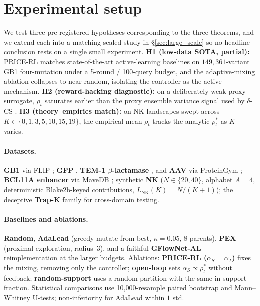 \section{Experimental setup}
\label{sec:experiments}

We test three pre-registered hypotheses corresponding to the three theorems, and we extend each into a matching scaled study in §\ref{sec:large_scale} so no headline conclusion rests on a single small experiment. \textbf{H1 (low-data SOTA, partial):} PRICE-RL matches state-of-the-art active-learning baselines on $149{,}361$-variant GB1 four-mutation \citep{wu2016adaptation} under a 5-round / 100-query budget, and the adaptive-mixing ablation collapses to near-random, isolating the controller as the active mechanism. \textbf{H2 (reward-hacking diagnostic):} on a deliberately weak proxy surrogate, $\rho_t$ saturates earlier than the proxy ensemble variance signal used by $\delta$-CS \citep{kim2025deltacs}. \textbf{H3 (theory--empirics match):} on NK landscapes \citep{kauffman1989nk} swept across $K\in\{0,1,3,5,10,15,19\}$, the empirical mean $\rho_t$ tracks the analytic $\rho^*_t$ as $K$ varies.

\paragraph{Datasets.} \textbf{GB1} via FLIP \citep{dallago2021flip}; \textbf{GFP} \citep{sarkisyan2016local}, \textbf{TEM-1 $\beta$-lactamase} \citep{stiffler2015evolvability}, and \textbf{AAV} \citep{bryant2021deep} via ProteinGym \citep{notin2023proteingym}; \textbf{BCL11A enhancer} \citep{kircher2019saturation} via MaveDB \citep{esposito2019mavedb}; synthetic \textbf{NK} ($N\!\in\!\{20,40\}$, alphabet $A=4$, deterministic Blake2b-keyed contributions, $L_{\mathrm{NK}}(K) = N/(K+1)$); the deceptive \textbf{Trap-K} family for cross-domain testing.

\paragraph{Baselines and ablations.} \textbf{Random}, \textbf{AdaLead} \citep{sinai2020adalead} (greedy mutate-from-best, $\kappa = 0.05$, 8 parents), \textbf{PEX} \citep{ren2022proximal} (proximal exploration, radius~3), and a faithful \textbf{GFlowNet-AL} reimplementation \citep{jain2022biological} at the larger budgets. Ablations: \textbf{PRICE-RL ($\alpha_S=\alpha_T$)} fixes the mixing, removing only the controller; \textbf{open-loop} sets $\alpha_S \propto \rho^*_t$ without feedback; \textbf{random-support} uses a random partition with the same in-support fraction. Statistical comparisons use 10{,}000-resample paired bootstrap and Mann--Whitney U-tests; non-inferiority for AdaLead within $1$ std.
